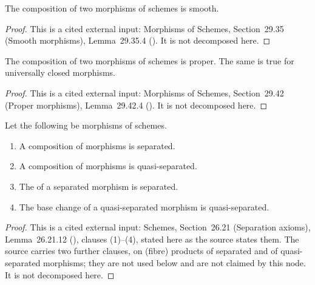 \begin{lemma}
\label{lem:pc-smooth-composition}
The composition of two  morphisms of schemes is
smooth.
\end{lemma}
\begin{proof}
This is a cited external input: Morphisms of Schemes, Section~29.35 (Smooth morphisms),
Lemma~29.35.4 ().  It is not decomposed here.
\end{proof}

\begin{lemma}
\label{lem:pc-proper-composition}
The composition of two  morphisms of schemes
is proper.  The same is true for universally closed morphisms.
\end{lemma}
\begin{proof}
This is a cited external input: Morphisms of Schemes, Section~29.42 (Proper morphisms),
Lemma~29.42.4 ().  It is not decomposed here.
\end{proof}

\begin{lemma}
\label{lem:pc-separated-permanence}
Let the following be morphisms of schemes.
\begin{enumerate}
\item A composition of 
  morphisms is separated.
\item A composition of
   morphisms is
  quasi-separated.
\item The  of a separated
  morphism is separated.
\item The base change of a quasi-separated morphism is quasi-separated.
\end{enumerate}
\end{lemma}
\begin{proof}
This is a cited external input: Schemes, Section~26.21 (Separation axioms),
Lemma~26.21.12 (), clauses (1)--(4), stated here as the
source states them.  The source carries two further clauses, on (fibre)
products of separated and of quasi-separated morphisms; they are not used
below and are not claimed by this node.  It is not decomposed here.
\end{proof}

